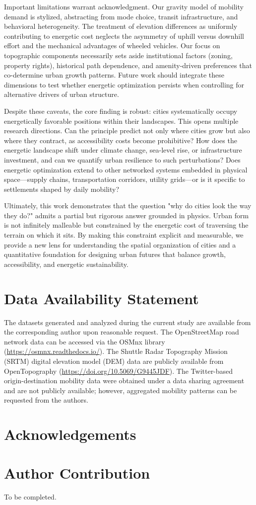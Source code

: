 \documentclass[twocolumn,amsmath,amssymb,floatfix,nature,shownopacs,footinbib,superscriptaddress]{revtex4-1} %
\begin{document}
Important limitations warrant acknowledgment.
Our gravity model of mobility demand is stylized, abstracting from mode choice, transit infrastructure, and behavioral heterogeneity.
The treatment of elevation differences as uniformly contributing to energetic cost neglects the asymmetry of uphill versus downhill effort and the mechanical advantages of wheeled vehicles.
Our focus on topographic components necessarily sets aside institutional factors (zoning, property rights), historical path dependence, and amenity-driven preferences that co-determine urban growth patterns.
Future work should integrate these dimensions to test whether energetic optimization persists when controlling for alternative drivers of urban structure.

Despite these caveats, the core finding is robust: cities systematically occupy energetically favorable positions within their landscapes.
This opens multiple research directions.
Can the principle predict not only where cities grow but also where they contract, as accessibility costs become prohibitive?
How does the energetic landscape shift under climate change, sea-level rise, or infrastructure investment, and can we quantify urban resilience to such perturbations?
Does energetic optimization extend to other networked systems embedded in physical space—supply chains, transportation corridors, utility grids—or is it specific to settlements shaped by daily mobility?

Ultimately, this work demonstrates that the question "why do cities look the way they do?" admits a partial but rigorous answer grounded in physics.
Urban form is not infinitely malleable but constrained by the energetic cost of traversing the terrain on which it sits.
By making this constraint explicit and measurable, we provide a new lens for understanding the spatial organization of cities and a quantitative foundation for designing urban futures that balance growth, accessibility, and energetic sustainability.

\section*{Data Availability Statement}

The datasets generated and analyzed during the current study are available from the corresponding author upon reasonable request. The OpenStreetMap road network data can be accessed via the OSMnx library (\url{https://osmnx.readthedocs.io/}). The Shuttle Radar Topography Mission (SRTM) digital elevation model (DEM) data are publicly available from OpenTopography (\url{https://doi.org/10.5069/G9445JDF}). The Twitter-based origin-destination mobility data were obtained under a data sharing agreement and are not publicly available; however, aggregated mobility patterns can be requested from the authors.

\section*{Acknowledgements}


\section*{Author Contribution}
To be completed.




\end{document}
